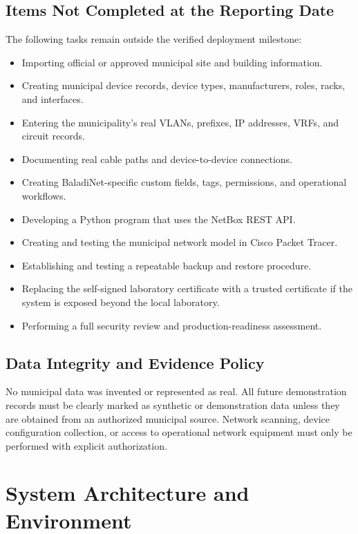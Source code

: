 \documentclass[11pt,a4paper,oneside]{report}
\begin{document}
\section{Items Not Completed at the Reporting Date}
The following tasks remain outside the verified deployment milestone:
\begin{itemize}
  \item Importing official or approved municipal site and building information.
  \item Creating municipal device records, device types, manufacturers, roles, racks, and interfaces.
  \item Entering the municipality's real VLANs, prefixes, IP addresses, VRFs, and circuit records.
  \item Documenting real cable paths and device-to-device connections.
  \item Creating BaladiNet-specific custom fields, tags, permissions, and operational workflows.
  \item Developing a Python program that uses the NetBox REST API.
  \item Creating and testing the municipal network model in Cisco Packet Tracer.
  \item Establishing and testing a repeatable backup and restore procedure.
  \item Replacing the self-signed laboratory certificate with a trusted certificate if the system is exposed beyond the local laboratory.
  \item Performing a full security review and production-readiness assessment.
\end{itemize}

\section{Data Integrity and Evidence Policy}
No municipal data was invented or represented as real. All future demonstration records must be clearly marked as synthetic or demonstration data unless they are obtained from an authorized municipal source. Network scanning, device configuration collection, or access to operational network equipment must only be performed with explicit authorization.

\chapter{System Architecture and Environment}
\end{document}
